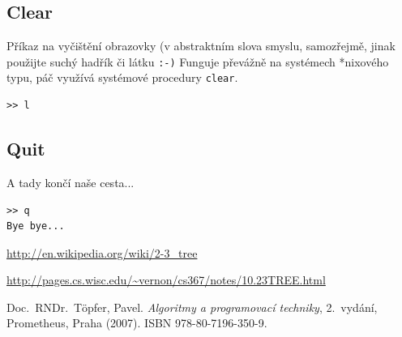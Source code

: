 \documentclass[11pt,a4paper]{article}
\begin{document}
\subsection{Clear}
Příkaz na vyčištění obrazovky (v abstraktním slova smyslu, samozřejmě, jinak
použijte suchý hadřík či látku {\tt :-)}
Funguje převážně na systémech *nixového typu, páč využívá systémové procedury
\verb=clear=.

\begin{verbatim}
>> l
\end{verbatim}

\subsection{Quit}
A tady končí naše cesta...

\begin{verbatim}
>> q
Bye bye...
\end{verbatim}

\pagebreak

\begin{thebibliography}{9}

\url{http://en.wikipedia.org/wiki/2-3_tree}

\url{http://pages.cs.wisc.edu/~vernon/cs367/notes/10.23TREE.html}

Doc.~RNDr.~T\"opfer, Pavel. \textsl{Algoritmy a programovací techniky},
2.~vydání, Prometheus, Praha (2007). ISBN 978-80-7196-350-9.

\end{thebibliography}
\end{document}
